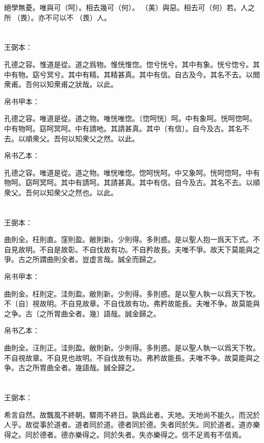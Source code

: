 \documentclass[a5paper]{ctexbook}
\begin{document}
    絕學無憂。唯與可（呵）。相去幾可（何）。𡵂（美）與惡。相去可（何）若。人之所𥚸（畏）。亦不可以不𥚸（畏）人。

    \chapter{}
    王弼本：

    孔德之容。惟道是從。道之爲物。惟恍惟惚。惚兮恍兮。其中有象。恍兮惚兮。其中有物。窈兮冥兮。其中有精。其精甚真。其中有信。自古及今。其名不去。以閲衆甫。吾何以知衆甫之狀哉。以此。

    
    帛书甲本：

    孔德之容。唯道是從。道之物。唯恍唯惚。〔惚呵恍〕呵。中有象呵。恍呵惚呵。中有物呵。窈呵冥呵。中有請吔。其請甚真。其中〔有信〕。自今及古。其名不去。以順衆父。吾何以知衆父之然。以此。

    帛书乙本：

    孔德之容。唯道是從。道之物。唯恍唯惚。惚呵恍呵。中又象呵。恍呵惚呵。中有物呵。窈呵冥呵。其中有請呵。其請甚真。其中有信。自今及古。其名不去。以順衆父。吾何以知衆父之然也。以此。

    \chapter{}
    王弼本：

    曲則全。枉則直。窪則盈。敝則新。少則得。多則惑。是以聖人抱一爲天下式。不自見故明。不自是故彰。不自伐故有功。不自矜故長。夫唯不爭。故天下莫能與之爭。古之所謂曲則全者。豈虚言哉。誠全而歸之。

    
    帛书甲本：

    曲則金。枉則定。洼則盈。敝則新。少則得。多則惑。是以聖人執一以爲天下牧。不〔自〕視故明。不自見故章。不自伐故有功。弗矜故能長。夫唯不争。故莫能與之争。古〔之所胃曲全者。幾〕語哉。誠金歸之。

    帛书乙本：

    曲則全。汪則正。洼則盈。敝則新。少則得。多則惑。是以聖人執一以爲天下牧。不自視故章。不自見也故明。不自伐故有功。弗矜故能長。夫唯不争。故莫能與之争。古之所胃曲全者。幾語哉。誠全歸之。

    \chapter{}
    王弼本：

    希言自然。故飄風不終朝。驟雨不終日。孰爲此者。天地。天地尚不能久。而況於人乎。故從事於道者。道者同於道。德者同於德。失者同於失。同於道者。道亦樂得之。同於德者。德亦樂得之。同於失者。失亦樂得之。信不足焉有不信焉。
\end{document}

